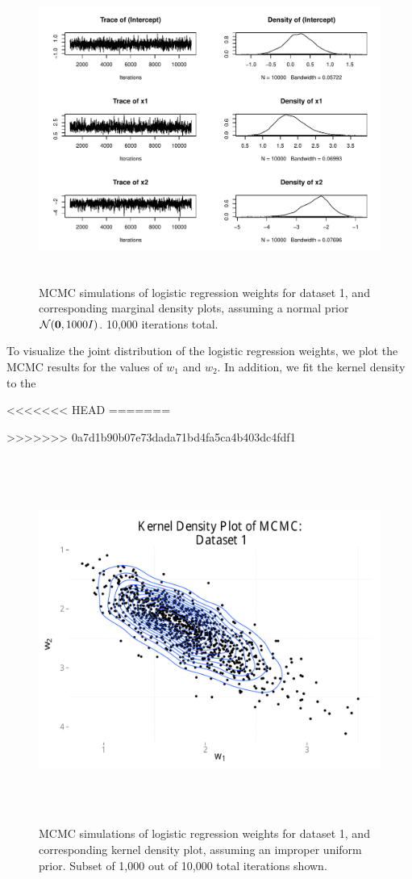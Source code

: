 \begin{figure}
\centering
	\includegraphics[height=100mm]{figures/mcmc_normal.pdf}
    \caption{MCMC simulations of logistic regression weights for dataset 1, and corresponding marginal density plots, assuming 
    a normal prior $\mathcal{N}(\boldsymbol{\mathbf{0}},1000I)$. 10,000 iterations total.}  \label{fig:mcmc_iterations_normal}  
\end{figure}

To visualize the joint distribution of the logistic regression weights, we plot the MCMC results for the values of $w_1$ and $w_2$.  In addition, we fit the kernel density to the 

<<<<<<< HEAD
%
=======

>>>>>>> 0a7d1b90b07e73dada71bd4fa5ca4b403dc4fdf1

\begin{figure}
\centering
	\includegraphics[height=120mm]{figures/mcmc_uniform_2d.pdf}
    \caption{MCMC simulations of logistic regression weights for dataset 1, and corresponding kernel density plot, assuming 
    an improper uniform prior.  Subset of 1,000 out of 10,000 total iterations shown.}  \label{fig:mcmc_kernel}  
\end{figure}

